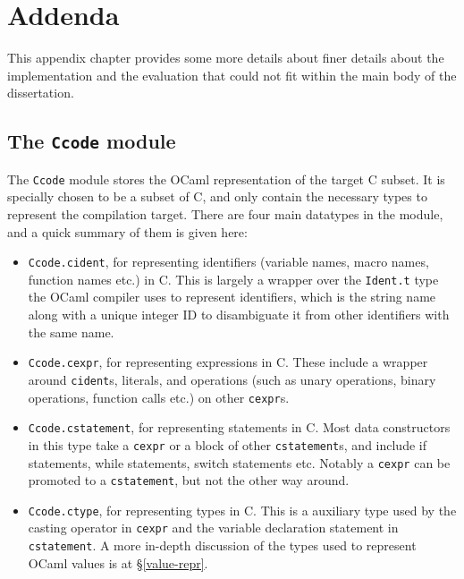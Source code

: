 \appendix

\chapter{Addenda}

This appendix chapter provides some more details about finer details about the
implementation and the evaluation that could not fit within the main body of the
dissertation.

\section{The \texttt{Ccode} module} \label{ccode}

The \texttt{Ccode} module stores the OCaml representation of the target C
subset. It is specially chosen to be a subset of C, and only contain the
necessary types to represent the compilation target. There are four main
datatypes in the module, and a quick summary of them is given here:

\begin{itemize}

\item \texttt{Ccode.cident}, for representing identifiers (variable names, macro
    names, function names etc.) in C. This is largely a wrapper over the
    \texttt{Ident.t} type the OCaml compiler uses to represent identifiers,
    which is the string name along with a unique integer ID to disambiguate it
    from other identifiers with the same name.

\item \texttt{Ccode.cexpr}, for representing expressions in C. These include a
    wrapper around \texttt{cident}s, literals, and operations (such as unary
    operations, binary operations, function calls etc.) on other
    \texttt{cexpr}s.

\item \texttt{Ccode.cstatement}, for representing statements in C. Most data
    constructors in this type take a \texttt{cexpr} or a block of other
    \texttt{cstatement}s, and include if statements, while statements, switch
    statements etc. Notably a \texttt{cexpr} can be promoted to a
    \texttt{cstatement}, but not the other way around.

\item \texttt{Ccode.ctype}, for representing types in C. This is a auxiliary
    type used by the casting operator in \texttt{cexpr} and the variable
    declaration statement in \texttt{cstatement}. A more in-depth discussion of
    the types used to represent OCaml values is at \S\ref{value-repr}.

\end{itemize}

